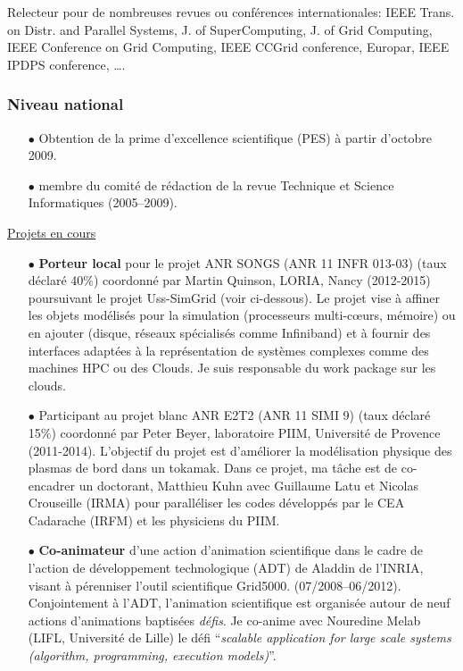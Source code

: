 \documentclass[11pt]{article}
\begin{document}
Relecteur pour de nombreuses revues ou conférences internationales: IEEE Trans. on Distr. and Parallel Systems, 
J. of SuperComputing, J. of Grid Computing, IEEE Conference on Grid Computing, IEEE CCGrid conference, Europar,
IEEE IPDPS conference, \ldots.


\subsubsection{Niveau national}
\begin{itemize}

\item[$\bullet$] Obtention de la prime d'excellence scientifique (PES) à partir d'octobre 2009.\\

\item [$\bullet$]
membre du comité de rédaction de la revue Technique et Science Informatiques (2005--2009).\\
\end{itemize}

\underline{Projets en cours}\\
\begin{itemize}


\item[$\bullet$]
\textbf{Porteur local} pour le projet ANR SONGS (ANR 11 INFR 013-03)  (taux déclaré 40\%)
coordonné par Martin Quinson, LORIA, Nancy (2012-2015)  poursuivant le projet 
Uss-SimGrid (voir ci-dessous). Le projet vise à affiner les objets modélisés pour la 
simulation (processeurs multi-c{\oe}urs, mémoire) ou en ajouter (disque, réseaux spécialisés
comme Infiniband) et à fournir des interfaces adaptées à la représentation de systèmes
complexes comme des machines HPC ou des Clouds. Je suis responsable du work package
sur les clouds.\\

\item[$\bullet$]
Participant au projet blanc ANR E2T2 (ANR 11 SIMI 9) (taux déclaré 15\%) coordonné par 
Peter Beyer, laboratoire PIIM, Université de Provence (2011-2014). L'objectif du projet 
est d'améliorer la modélisation physique des plasmas de bord dans un tokamak. Dans ce
projet, ma tâche est de co-encadrer un doctorant, Matthieu Kuhn avec Guillaume Latu et
Nicolas Crouseille (IRMA) pour paralléliser les codes développés par le CEA Cadarache 
(IRFM) et les physiciens du PIIM. \\

\item[$\bullet$]
\textbf{Co-animateur} d'une action d'animation scientifique 
dans le cadre de l'action de développement technologique (ADT) de Aladdin de l'INRIA, 
visant à pérenniser l'outil scientifique Grid5000. (07/2008--06/2012). 
Conjointement à l'ADT, l'animation scientifique est organisée autour de neuf actions d'animations baptisées \emph{défis}.
Je co-anime avec Nouredine Melab (LIFL, Université de Lille) le défi 
``{\em scalable application for large scale systems (algorithm, programming, execution models)}''.\\
\end{itemize}
\end{document}
